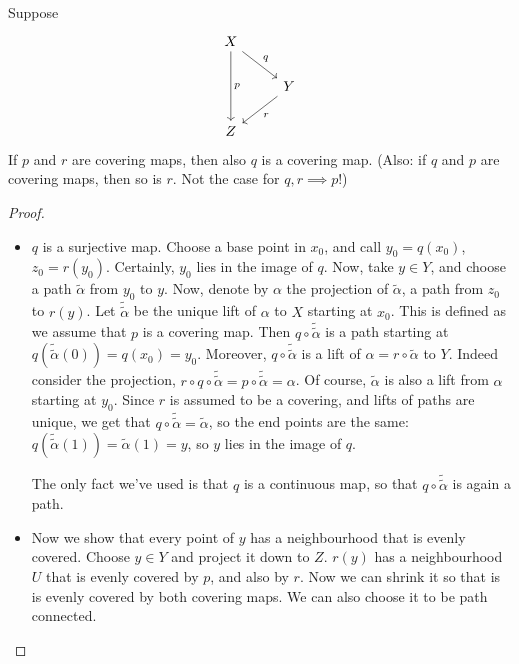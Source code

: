 \begin{lemma}[75.2] Suppose 
    \[
        \begin{tikzcd}
            X \arrow[dd, "p"]\arrow[dr, "q"]\\
            & Y \arrow[dl, "r"]\\
            Z
        \end{tikzcd}
    \]
    If $p$ and $r$ are covering maps, then also $q$ is a covering map.
    (Also: if $q$ and $p$ are covering maps, then so is $r$. Not the case for $q, r \implies p$!)
\end{lemma}
\begin{proof}
    \begin{itemize}
        \item $q$ is a surjective map. Choose a base point in $x_0$, and call $y_0 = q(x_0)$, $z_0 = r(y_0)$.
            Certainly, $y_0$ lies in the image of $q$.
            Now, take $y \in Y$, and choose a path $\tilde{\alpha}$ from $y_0$ to $y$.
            Now, denote by $\alpha$ the projection of  $\tilde{\alpha}$, a path from $z_0$ to $r(y)$.
            Let $\tilde{\tilde{\alpha}}$ be the unique lift of $\alpha$ to $X$ starting at $x_0$. This is defined as we assume that $p$ is a covering map.
            Then $q  \circ  \tilde{\tilde{\alpha}}$ is a path starting at $q (\tilde{\tilde{\alpha}}(0)) = q(x_0) = y_0$.
            Moreover, $q  \circ  \tilde{\tilde{\alpha}}$ is a lift of $\alpha = r  \circ \tilde{\alpha}$ to $Y$.
            Indeed consider the projection, $r  \circ  q  \circ  \tilde{\tilde{\alpha}} = p  \circ \tilde{\tilde{\alpha}} = \alpha$.
            Of course, $\tilde{\alpha}$ is also a lift from $\alpha$ starting at $y_0$.
            Since $r$ is assumed to be a covering, and lifts of paths are unique, we get that $q  \circ  \tilde{\tilde{\alpha}} = \tilde{\alpha}$, so the end points are the same: $q (\tilde{\tilde{\alpha}}(1)) = \tilde{\alpha}(1) = y$, so $y$ lies in the image of  $q$.

            The only fact we've used is that $q$ is a continuous map, so that $q  \circ \tilde{\tilde{\alpha}}$ is again a path.

        \item Now we show that every point of $y$ has a neighbourhood that is evenly covered.
            Choose $ y \in Y$ and project it down to $Z$. $r(y)$ has a neighbourhood $U$ that is evenly covered by $p$, and also by $r$. Now we can shrink it so that is is evenly covered by both covering maps. We can also choose it to be path connected.


\end{itemize}
\end{proof}
